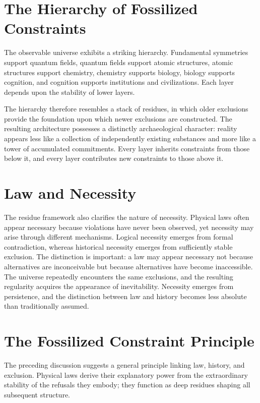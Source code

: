 \documentclass[11pt,oneside]{book}
\theoremstyle{plain}
\theoremstyle{definition}
\theoremstyle{remark}
\begin{document}
\section{The Hierarchy of Fossilized Constraints}

The observable universe exhibits a striking hierarchy. Fundamental symmetries support quantum fields, quantum fields support atomic structures, atomic structures support chemistry, chemistry supports biology, biology supports cognition, and cognition supports institutions and civilizations. Each layer depends upon the stability of lower layers.

The hierarchy therefore resembles a stack of residues, in which older exclusions provide the foundation upon which newer exclusions are constructed. The resulting architecture possesses a distinctly archaeological character: reality appears less like a collection of independently existing substances and more like a tower of accumulated commitments. Every layer inherits constraints from those below it, and every layer contributes new constraints to those above it.

\section{Law and Necessity}

The residue framework also clarifies the nature of necessity. Physical laws often appear necessary because violations have never been observed, yet necessity may arise through different mechanisms. Logical necessity emerges from formal contradiction, whereas historical necessity emerges from sufficiently stable exclusion. The distinction is important: a law may appear necessary not because alternatives are inconceivable but because alternatives have become inaccessible. The universe repeatedly encounters the same exclusions, and the resulting regularity acquires the appearance of inevitability. Necessity emerges from persistence, and the distinction between law and history becomes less absolute than traditionally assumed.

\section{The Fossilized Constraint Principle}

The preceding discussion suggests a general principle linking law, history, and exclusion. Physical laws derive their explanatory power from the extraordinary stability of the refusals they embody; they function as deep residues shaping all subsequent structure.
\end{document}
